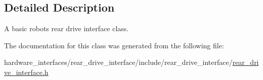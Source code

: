 \subsection{Detailed Description}
A basic robot\textquotesingle{}s rear drive interface class. 

The documentation for this class was generated from the following file\+:\begin{DoxyCompactItemize}
\item 
hardware\+\_\+interfaces/rear\+\_\+drive\+\_\+interface/include/rear\+\_\+drive\+\_\+interface/\hyperlink{rear__drive__interface_8h}{rear\+\_\+drive\+\_\+interface.\+h}\end{DoxyCompactItemize}
